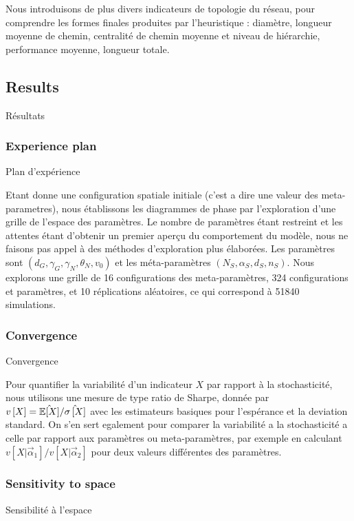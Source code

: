 Nous introduisons de plus divers indicateurs de topologie du réseau, pour comprendre les formes finales produites par l'heuristique : diamètre, longueur moyenne de chemin, centralité de chemin moyenne et niveau de hiérarchie, performance moyenne, longueur totale.




\subsection{Results}{Résultats}


\subsubsection{Experience plan}{Plan d'expérience}

Etant donne une configuration spatiale initiale (c'est a dire une valeur des meta-parametres), nous établissons les diagrammes de phase par l'exploration d'une grille de l'espace des paramètres. Le nombre de paramètres étant restreint et les attentes étant d'obtenir un premier aperçu du comportement du modèle, nous ne faisons pas appel à des méthodes d'exploration plus élaborées. Les paramètres sont $(d_G,\gamma_G,\gamma_N,\theta_N,v_0)$ et les méta-paramètres $(N_S,\alpha_S,d_S,n_S)$. Nous explorons une grille de 16 configurations des meta-paramètres, 324 configurations et paramètres, et 10 réplications aléatoires, ce qui correspond à 51840 simulations.



\subsubsection{Convergence}{Convergence}


Pour quantifier la variabilité d'un indicateur $X$ par rapport à la stochasticité, nous utilisons une mesure de type ratio de Sharpe, donnée par $v\left[X\right] = \hat{\operatorname{\mathbb{E}}\!\left[X\right]}/\hat{\sigma\left[X\right]}$ avec les estimateurs basiques pour l'espérance et la deviation standard. On s'en sert egalement pour comparer la variabilité a la stochasticité a celle par rapport aux paramètres ou meta-paramètres, par exemple en calculant $v\left[X|\vec{\alpha}_1\right]/v\left[X|\vec{\alpha}_2\right]$ pour deux valeurs différentes des paramètres.





\subsubsection{Sensitivity to space}{Sensibilité à l'espace}

